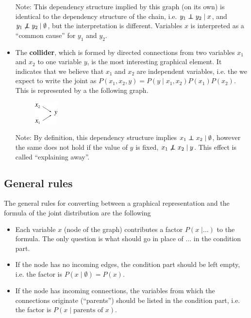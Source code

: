 \begin{itemize}
	Note: This dependency structure implied by this graph (on its own) is identical to the dependency structure of the chain, i.e. $y_1 \independent y_2 \;|\;x$, and $y_1 \not\independent y_2\; | \; \emptyset$, but the interpretation is different. Variables $x$ is interpreted as a ``common cause'' for $y_1$ and $y_2$.

	\item The {\bf collider}, which is formed by directed connections from two variables $x_1$ and $x_2$ to one variable $y$, is the most interesting graphical element. It indicates that we believe that $x_1$ and $x_2$ are independent variables, i.e. the we expect to write the joint as $P(x_1, x_2, y) = P(y\;|\;x_1, x_2) P(x_1) P(x_2)$. This is represented by a the following graph.
	\begin{figure}[h!]
	\centering
		\includegraphics[height=12mm]{./figs/04-x1x2y.pdf} 
	\end{figure}

	Note: By definition, this dependency structure implies $x_1 \independent x_2\;|\;\emptyset$, however the same does not hold if the value of $y$ is fixed, $x_1 \not\independent x_2\;|\;y$. This effect is called ``explaining away''.
	
\end{itemize}

\subsection{General rules}


The general rules for converting between a graphical representation and the formula of the joint distribution are the following
\begin{itemize}
	\item Each variable $x$ (node of the graph) contributes a factor $P(x\;|\ldots)$ to the formula. The only question is what should go in place of $\ldots$ in the condition part.

	\item If the node has no incoming edges, the condition part should be left empty, i.e. the factor is $P(x\;|\;\emptyset) = P(x)$.

	\item If the node has incoming connections, the variables from which the connections originate (``parents'') should be listed in the condition part, i.e. the factor is $P(x\;|\;\text{parents of }x)$.
\end{itemize}


